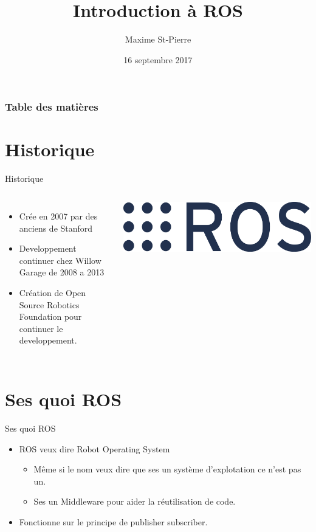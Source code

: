 \documentclass{beamer}
\title{Introduction à ROS}
\author{Maxime St-Pierre}
\institute{Walking Machine - ÉTS}
\date{16 septembre 2017}
\begin{document}
\begin{frame}
\titlepage
\end{frame}

\begin{frame}
\frametitle{Table des matières}
\tableofcontents

\end{frame}

\section{Historique}

\begin{frame}{Historique}
\begin{columns}
	\begin{itemize}
		\item Crée en 2007 par des anciens de Stanford
		\item Developpement continuer chez Willow Garage de 2008 a 2013
		\item Création de Open Source Robotics Foundation pour continuer le developpement.
	\end{itemize}

	\includegraphics[width=\textwidth]{ros_logo.png}
\end{columns}
\end{frame}

\section{Ses quoi ROS}
\begin{frame}{Ses quoi ROS}
\begin{itemize}
	\item ROS veux dire Robot Operating System
	\begin{itemize}
		\item Même si le nom veux dire que ses un système d'explotation ce n'est pas un.
		\item Ses un Middleware pour aider la réutilisation de code.
	\end{itemize}
	\item Fonctionne sur le principe de publisher subscriber.
\end{itemize}
\end{frame}
\end{document}
